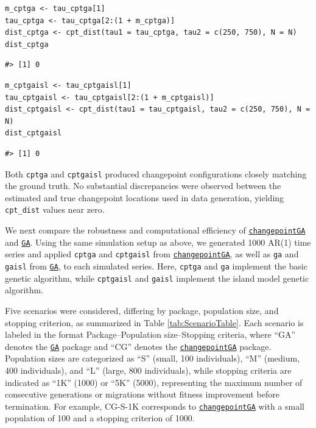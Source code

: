 \begin{verbatim}
m_cptga <- tau_cptga[1]
tau_cptga <- tau_cptga[2:(1 + m_cptga)]
dist_cptga <- cpt_dist(tau1 = tau_cptga, tau2 = c(250, 750), N = N)
dist_cptga
\end{verbatim}

\begin{verbatim}
#> [1] 0
\end{verbatim}

\begin{verbatim}
m_cptgaisl <- tau_cptgaisl[1]
tau_cptgaisl <- tau_cptgaisl[2:(1 + m_cptgaisl)]
dist_cptgaisl <- cpt_dist(tau1 = tau_cptgaisl, tau2 = c(250, 750), N = N)
dist_cptgaisl
\end{verbatim}

\begin{verbatim}
#> [1] 0
\end{verbatim}

Both \texttt{cptga} and \texttt{cptgaisl} produced changepoint configurations closely matching the ground truth. No substantial discrepancies were observed between the estimated and true changepoint locations used in data generation, yielding \texttt{cpt\_dist} values near zero.

We next compare the robustness and computational efficiency of \href{https://CRAN.R-project.org/package=changepointGA}{\texttt{changepointGA}} and \href{https://CRAN.R-project.org/package=GA}{\texttt{GA}}. Using the same simulation setup as above, we generated 1000 AR(1) time series and applied \texttt{cptga} and \texttt{cptgaisl} from \href{https://CRAN.R-project.org/package=changepointGA}{\texttt{changepointGA}}, as well as \texttt{ga} and \texttt{gaisl} from \href{https://CRAN.R-project.org/package=GA}{\texttt{GA}}, to each simulated series. Here, \texttt{cptga} and \texttt{ga} implement the basic genetic algorithm, while \texttt{cptgaisl} and \texttt{gaisl} implement the island model genetic algorithm.

Five scenarios were considered, differing by package, population size, and stopping criterion, as summarized in Table \ref{tab:ScenarioTable}. Each scenario is labeled in the format Package--Population size--Stopping criteria, where ``GA'' denotes the \href{https://CRAN.R-project.org/package=GA}{\texttt{GA}} package and ``CG'' denotes the \href{https://CRAN.R-project.org/package=changepointGA}{\texttt{changepointGA}} package. Population sizes are categorized as ``S'' (small, 100 individuals), ``M'' (medium, 400 individuals), and ``L'' (large, 800 individuals), while stopping criteria are indicated as ``1K'' (1000) or ``5K'' (5000), representing the maximum number of consecutive generations or migrations without fitness improvement before termination. For example, CG-S-1K corresponds to \href{https://CRAN.R-project.org/package=changepointGA}{\texttt{changepointGA}} with a small population of 100 and a stopping criterion of 1000.

